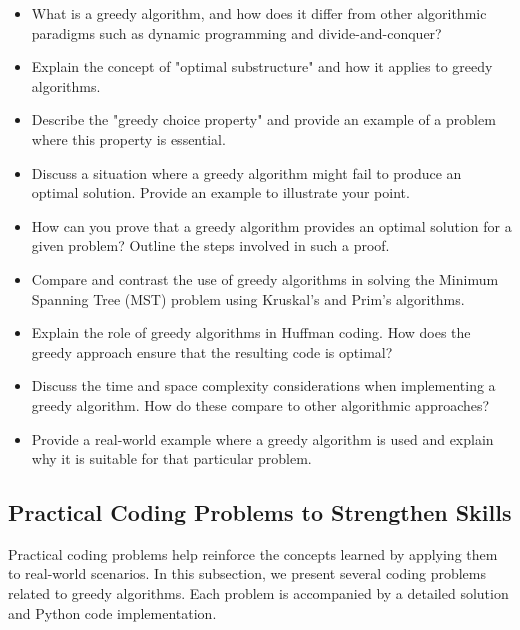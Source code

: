 \documentclass[12pt]{book} %
\begin{document}
\begin{itemize}
    \item What is a greedy algorithm, and how does it differ from other algorithmic paradigms such as dynamic programming and divide-and-conquer?
    \item Explain the concept of "optimal substructure" and how it applies to greedy algorithms.
    \item Describe the "greedy choice property" and provide an example of a problem where this property is essential.
    \item Discuss a situation where a greedy algorithm might fail to produce an optimal solution. Provide an example to illustrate your point.
    \item How can you prove that a greedy algorithm provides an optimal solution for a given problem? Outline the steps involved in such a proof.
    \item Compare and contrast the use of greedy algorithms in solving the Minimum Spanning Tree (MST) problem using Kruskal's and Prim's algorithms.
    \item Explain the role of greedy algorithms in Huffman coding. How does the greedy approach ensure that the resulting code is optimal?
    \item Discuss the time and space complexity considerations when implementing a greedy algorithm. How do these compare to other algorithmic approaches?
    \item Provide a real-world example where a greedy algorithm is used and explain why it is suitable for that particular problem.
\end{itemize}

\subsection{Practical Coding Problems to Strengthen Skills}
Practical coding problems help reinforce the concepts learned by applying them to real-world scenarios. In this subsection, we present several coding problems related to greedy algorithms. Each problem is accompanied by a detailed solution and Python code implementation.
\end{document}

